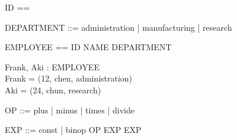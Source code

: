 \documentclass{llncs}
\begin{document}
\begin{zed}
[NAME]
\end{zed}
\begin{zed}
ID == \nat
\end{zed}
\begin{zed}
DEPARTMENT ::= administration | manufacturing | research
\end{zed}
\begin{zed}
EMPLOYEE == ID \cross NAME \cross DEPARTMENT
\end{zed}
\begin{axdef}
Frank, Aki : EMPLOYEE \\
\where Frank = (12, chen, administration) \\
Aki = (24, chun, research)
\end{axdef}

\begin{zed}
OP ::= plus | minus | times | divide
\end{zed}
\begin{zed}
EXP ::= const \lang \nat \rang | binop \lang OP \cross EXP
\cross EXP \rang
\end{zed}
\end{document}
